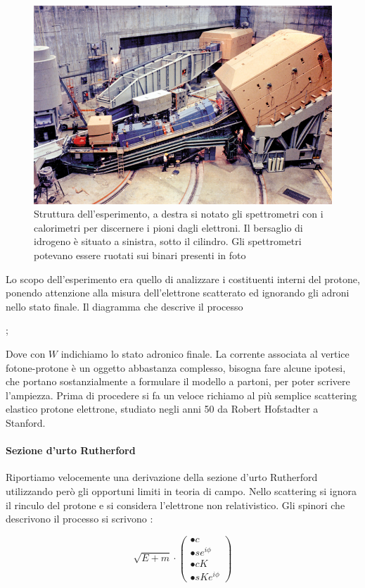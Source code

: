 \begin{figure}[hbtp]
\centering
\includegraphics[scale=0.5]{CCsla3_09_12.jpg}
\caption{Struttura dell'esperimento, a destra si notato gli spettrometri con i calorimetri per discernere i pioni dagli elettroni. Il bersaglio di idrogeno è situato a sinistra, sotto il cilindro. Gli spettrometri potevano essere ruotati sui binari presenti in foto }
\end{figure}

Lo scopo dell'esperimento era quello di analizzare i costituenti interni del protone, ponendo attenzione alla misura dell'elettrone scatterato ed ignorando gli adroni nello stato finale. Il diagramma che descrive il processo 
\begin{center}

;
\end{center}

Dove con $W$ indichiamo lo stato adronico finale. La corrente associata al vertice fotone-protone è un oggetto abbastanza complesso, bisogna fare alcune ipotesi, che portano sostanzialmente a formulare il modello a partoni, per poter scrivere l'ampiezza. Prima di procedere si fa un veloce richiamo al più semplice scattering elastico protone elettrone, studiato negli anni 50 da Robert Hofstadter a Stanford.

\paragraph{Sezione d'urto Rutherford}

Riportiamo velocemente una derivazione della sezione d'urto Rutherford utilizzando però gli opportuni limiti in teoria di campo. Nello scattering si ignora il rinculo del protone e si considera l'elettrone non relativistico. Gli spinori che descrivono il processo si scrivono :

\begin{equation}
\sqrt{E + m}\cdot
\left (\begin{array}{c}
• c \\ 
• s e^{i\phi} \\ 
• c K\\ 
• s K e^{i\phi}
\end{array} \right )
\end{equation}